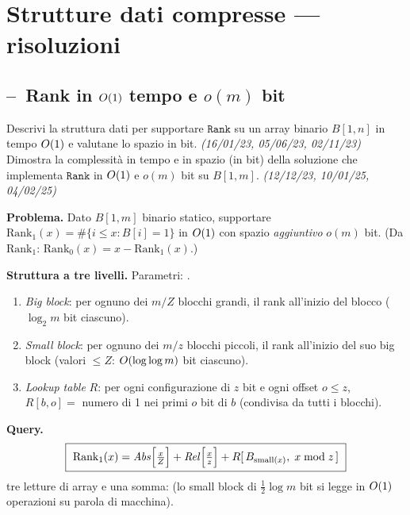 \section{Strutture dati compresse --- risoluzioni}

\subsection*{--\hot\ Rank in $O\!\left(1\right)$ tempo e $o(m)$ bit}

\begin{domanda}
 Descrivi la struttura dati per supportare $\texttt{Rank}$ su un array binario $B[1,n]$
in tempo $O\!\left(1\right)$ e valutane lo spazio in bit. \emph{(16/01/23, 05/06/23, 02/11/23)}\\
 Dimostra la complessit\`a in tempo e in spazio (in bit) della soluzione che implementa
$\texttt{Rank}$ in $O\!\left(1\right)$ e $o(m)$ bit su $B[1,m]$. \emph{(12/12/23, 10/01/25, 04/02/25)}
\end{domanda}

\textbf{Problema.} Dato $B[1,m]$ binario statico, supportare
$\mathrm{Rank}_1(x)=\#\{i\le x: B[i]=1\}$ in $O\!\left(1\right)$ con spazio \emph{aggiuntivo} $o(m)$ bit.
(Da $\mathrm{Rank}_1$: $\mathrm{Rank}_0(x)=x-\mathrm{Rank}_1(x)$.)

\textbf{Struttura a tre livelli.} Parametri:
.
\begin{enumerate}[leftmargin=1.8em,itemsep=1pt]
\item \emph{Big block}: per ognuno dei $m/Z$ blocchi grandi, il rank  all'inizio del
blocco ($\log_2 m$ bit ciascuno).
\item \emph{Small block}: per ognuno dei $m/z$ blocchi piccoli, il rank  all'inizio
del suo big block (valori $\le Z$: $O\!\left(\log\log m\right)$ bit ciascuno).
\item \emph{Lookup table} $R$: per ogni configurazione di $z$ bit e ogni offset $o\le z$,
$R[b,o]=$ numero di 1 nei primi $o$ bit di $b$ (condivisa da tutti i blocchi).
\end{enumerate}

\textbf{Query.}
\[
\boxed{\ \mathrm{Rank}_1(x)=\mathit{Abs}\Bigl[\tfrac{x}{Z}\Bigr]
+\mathit{Rel}\Bigl[\tfrac{x}{z}\Bigr]
+R[\,B_{\text{small}(x)},\;x\bmod z\,]\ }
\]
tre letture di array e una somma:  (lo small block di
$\frac12\log m$ bit si legge in $O\!\left(1\right)$ operazioni su parola di macchina).

